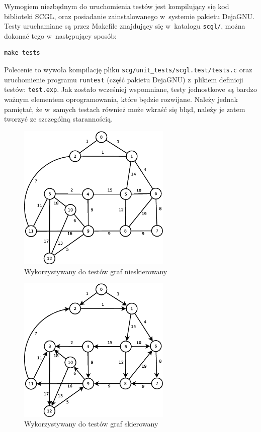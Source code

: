 \documentclass[a4paper,12pt,polish,oneside,openright]{thesis}
\newcommand\code[1]{\lstinline[style=line]{#1}}
\begin{document}
Wymogiem niezbędnym do uruchomienia testów jest kompilujący się kod biblioteki SCGL, oraz posiadanie zainstalowanego w~systemie pakietu DejaGNU.
Testy uruchamiane są przez Makefile znajdujący się w~katalogu \code{scgl/}, można dokonać tego w~następujący sposób:
\begin{lstlisting}[style=coden]
make tests
\end{lstlisting}
Polecenie to wywoła kompilację pliku \code{scg/unit_tests/scgl.test/tests.c} oraz uruchomienie programu \code{runtest} (część pakietu DejaGNU) z~plikiem definicji testów: \code{test.exp}.
Jak zostało wcześniej wspomniane, testy jednostkowe są bardzo ważnym elementem oprogramowania, które będzie rozwijane.
Należy jednak pamiętać, że w~samych testach również może wkraść się błąd, należy je zatem tworzyć ze szczególną starannością.

\begin{figure}[htb]
	\begin{center}
		\includegraphics[width=0.65\textwidth]{gfx/test_graph_undirected.eps}
		\caption{Wykorzystywany do testów graf nieskierowany}
		\label{fig:test_undirected}
	\end{center}
\end{figure}
\begin{figure}[htb]
	\begin{center}
		\includegraphics[width=0.65\textwidth]{gfx/test_graph_directed.eps}
		\caption{Wykorzystywany do testów graf skierowany}
		\label{fig:test_directed}
	\end{center}
\end{figure}
\end{document}
